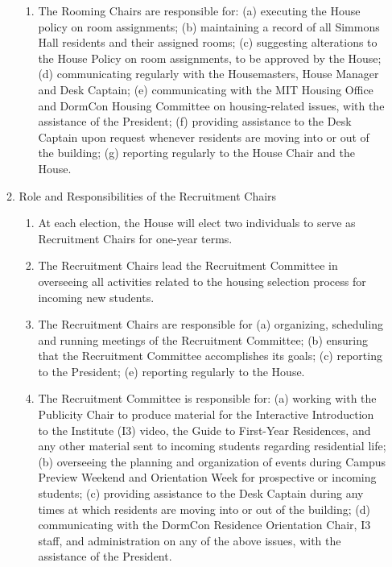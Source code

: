 \documentclass[letterpaper]{article}
\begin{document}
\begin{enumerate}
\begin{enumerate}
\begin{enumerate}
\item The Rooming Chairs are responsible for: (a) executing the House policy on room assignments; (b) maintaining a record of all Simmons Hall residents and their assigned rooms; (c) suggesting alterations to the House Policy on room assignments, to be approved by the House; (d) communicating regularly with the Housemasters, House Manager and Desk Captain; (e) communicating with the MIT Housing Office and DormCon Housing Committee on housing-related issues, with the assistance of the President; (f) providing assistance to the Desk Captain upon request whenever residents are moving into or out of the building; (g) reporting regularly to the House Chair and the House.

\end{enumerate}

\item Role and Responsibilities of the Recruitment Chairs

\begin{enumerate}

\item At each election, the House will elect two individuals to serve as Recruitment Chairs for one-year terms.

\item The Recruitment Chairs lead the Recruitment Committee in overseeing all activities related to the housing selection process for incoming new students.

\item The Recruitment Chairs are responsible for (a) organizing, scheduling and running meetings of the Recruitment Committee; (b) ensuring that the Recruitment Committee accomplishes its goals; (c) reporting to the President; (e) reporting regularly to the House. \item The Recruitment Committee is responsible for: (a) working with the Publicity Chair to produce material for the Interactive Introduction to the Institute (I3) video, the Guide to First-Year Residences, and any
other material sent to incoming students regarding residential life; (b) overseeing the planning and organization of events during Campus Preview Weekend and Orientation Week for prospective or incoming students; (c) providing assistance to the Desk Captain during any times at which residents are moving into or out of the building; (d) communicating with the DormCon Residence Orientation Chair, I3 staff, and administration on any of the above issues, with the assistance of the President.


\end{enumerate}
\end{enumerate}
\end{enumerate}
\end{document}
